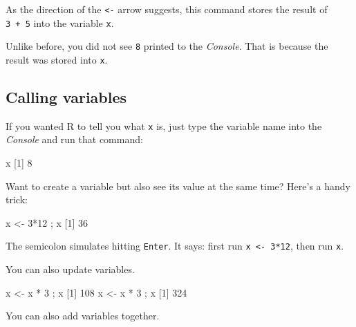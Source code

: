 \documentclass[
]{book}
\newenvironment{Shaded}{\begin{snugshade}}{\end{snugshade}}
\newcommand{\DecValTok}[1]{\textcolor[rgb]{0.00,0.00,0.81}{#1}}
\newcommand{\NormalTok}[1]{#1}
\newcommand{\OtherTok}[1]{\textcolor[rgb]{0.56,0.35,0.01}{#1}}
\newcommand{\SpecialCharTok}[1]{\textcolor[rgb]{0.00,0.00,0.00}{#1}}
\begin{document}
As the direction of the \texttt{\textless{}-} arrow suggests, this command stores the result of \texttt{3\ +\ 5} into the variable \texttt{x}.

Unlike before, you did not see \texttt{8} printed to the \emph{Console}. That is because the result was stored into \texttt{x}.

\hypertarget{calling-variables}{%
\subsection*{Calling variables}\label{calling-variables}}

If you wanted R to tell you what \texttt{x} is, just type the variable name into the \emph{Console} and run that command:

\begin{Shaded}
\begin{Highlighting}[]
\NormalTok{x}
\NormalTok{[}\DecValTok{1}\NormalTok{] }\DecValTok{8}
\end{Highlighting}
\end{Shaded}

Want to create a variable but also see its value at the same time? Here's a handy trick:

\begin{Shaded}
\begin{Highlighting}[]
\NormalTok{x }\OtherTok{\textless{}{-}} \DecValTok{3}\SpecialCharTok{*}\DecValTok{12}\NormalTok{ ; x}
\NormalTok{[}\DecValTok{1}\NormalTok{] }\DecValTok{36}
\end{Highlighting}
\end{Shaded}

The semicolon simulates hitting \texttt{Enter}. It says: first run \texttt{x\ \textless{}-\ 3*12}, then run \texttt{x}.

You can also update variables.

\begin{Shaded}
\begin{Highlighting}[]
\NormalTok{x }\OtherTok{\textless{}{-}}\NormalTok{ x }\SpecialCharTok{*} \DecValTok{3}\NormalTok{ ; x}
\NormalTok{[}\DecValTok{1}\NormalTok{] }\DecValTok{108}
\NormalTok{x }\OtherTok{\textless{}{-}}\NormalTok{ x }\SpecialCharTok{*} \DecValTok{3}\NormalTok{ ; x}
\NormalTok{[}\DecValTok{1}\NormalTok{] }\DecValTok{324}
\end{Highlighting}
\end{Shaded}

You can also add variables together.
\end{document}
